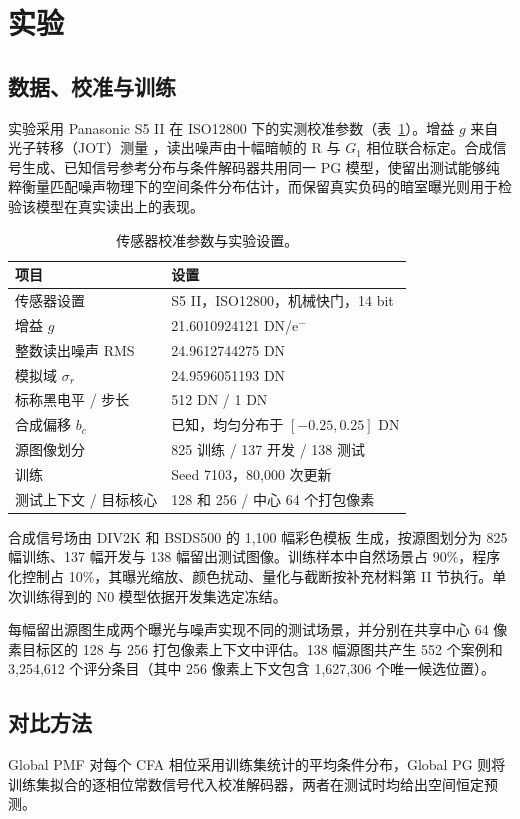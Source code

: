 \documentclass[10pt,twocolumn,journal]{IEEEtran}
\begin{document}
\section{实验}
\subsection{数据、校准与训练}
实验采用 Panasonic S5 II 在 ISO12800 下的实测校准参数（表~\ref{tab:protocol}）。增益 $g$ 来自光子转移（JOT）测量 \cite{jot}，读出噪声由十幅暗帧的 R 与 $G_1$ 相位联合标定。合成信号生成、已知信号参考分布与条件解码器共用同一 PG 模型，使留出测试能够纯粹衡量匹配噪声物理下的空间条件分布估计，而保留真实负码的暗室曝光则用于检验该模型在真实读出上的表现。

\begin{table}[t]
\centering\small
\caption{传感器校准参数与实验设置。}
\label{tab:protocol}
\begin{tabular}{@{}p{}p{}@{}}
\toprule
项目 & 设置\\
\midrule
传感器设置 & S5 II，ISO12800，机械快门，14 bit\\
增益 $g$ & 21.6010924121 DN/e$^{-}$\\
整数读出噪声 RMS & 24.9612744275 DN\\
模拟域 $\sigma_r$ & 24.9596051193 DN\\
标称黑电平 / 步长 & 512 DN / 1 DN\\
合成偏移 $b_c$ & 已知，均匀分布于 $[-0.25,0.25]$ DN\\
源图像划分 & 825 训练 / 137 开发 / 138 测试\\
训练 & Seed 7103，80,000 次更新\\
测试上下文 / 目标核心 & 128 和 256 / 中心 64 个打包像素\\
\bottomrule
\end{tabular}
\end{table}

合成信号场由 DIV2K 和 BSDS500 的 1,100 幅彩色模板 \cite{div2k,bsds500} 生成，按源图划分为 825 幅训练、137 幅开发与 138 幅留出测试图像。训练样本中自然场景占 90\%，程序化控制占 10\%，其曝光缩放、颜色扰动、量化与截断按补充材料第 II 节执行。单次训练得到的 N0 模型依据开发集选定冻结。

每幅留出源图生成两个曝光与噪声实现不同的测试场景，并分别在共享中心 64 像素目标区的 128 与 256 打包像素上下文中评估。138 幅源图共产生 552 个案例和 3,254,612 个评分条目（其中 256 像素上下文包含 1,627,306 个唯一候选位置）。

\subsection{对比方法}\label{sec:baselines}
Global PMF 对每个 CFA 相位采用训练集统计的平均条件分布，Global PG 则将训练集拟合的逐相位常数信号代入校准解码器，两者在测试时均给出空间恒定预测。
\end{document}
